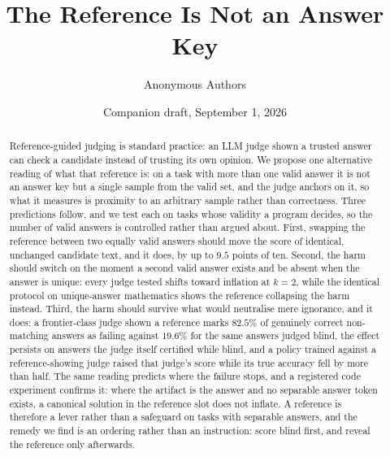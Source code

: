 \documentclass[11pt]{article}
\title{The Reference Is Not an Answer Key}
\author{Anonymous Authors}
\date{Companion draft, September 1, 2026}
\begin{document}
\maketitle

\begin{abstract}
\noindent
Reference-guided judging is standard practice: an LLM judge shown a trusted answer can check a candidate instead of trusting its own opinion.
We propose one alternative reading of what that reference is: on a task with more than one valid answer it is not an answer key but a single sample from the valid set, and the judge anchors on it, so what it measures is proximity to an arbitrary sample rather than correctness.
Three predictions follow, and we test each on tasks whose validity a program decides, so the number of valid answers is controlled rather than argued about.
First, swapping the reference between two equally valid answers should move the score of identical, unchanged candidate text, and it does, by up to $9.5$ points of ten.
Second, the harm should switch on the moment a second valid answer exists and be absent when the answer is unique: every judge tested shifts toward inflation at $k{=}2$, while the identical protocol on unique-answer mathematics shows the reference collapsing the harm instead.
Third, the harm should survive what would neutralise mere ignorance, and it does: a frontier-class judge shown a reference marks $82.5\%$ of genuinely correct non-matching answers as failing against $19.6\%$ for the same answers judged blind, the effect persists on answers the judge itself certified while blind, and a policy trained against a reference-showing judge raised that judge's score while its true accuracy fell by more than half.
The same reading predicts where the failure stops, and a registered code experiment confirms it: where the artifact is the answer and no separable answer token exists, a canonical solution in the reference slot does not inflate.
A reference is therefore a lever rather than a safeguard on tasks with separable answers, and the remedy we find is an ordering rather than an instruction: score blind first, and reveal the reference only afterwards.
\end{abstract}
\end{document}
